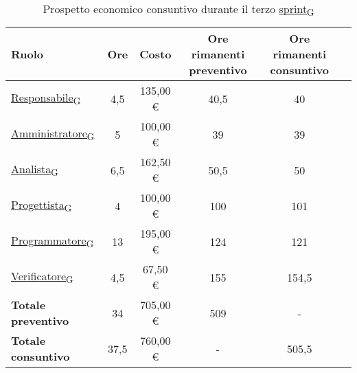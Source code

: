 \begin{table}[!h]
	\centering
	\begin{tabular}{ | l | c | c | c | c | c | }
		\hline
		\textbf{Ruolo}             & \textbf{Ore} & \textbf{Costo} & \textbf{Ore rimanenti preventivo} & \textbf{Ore rimanenti consuntivo} \\
		\hline
		\href{https://7last.github.io/docs/pb/documentazione-interna/glossario\#responsabile}{Responsabile\textsubscript{G}}               & 4,5          & 135,00 €       & 40,5                              & 40                                \\
		\href{https://7last.github.io/docs/pb/documentazione-interna/glossario\#amministratore}{Amministratore\textsubscript{G}}             & 5            & 100,00 €       & 39                                & 39                                \\
		\href{https://7last.github.io/docs/pb/documentazione-interna/glossario\#analista}{Analista\textsubscript{G}}                   & 6,5          & 162,50 €       & 50,5                              & 50                                \\
		\href{https://7last.github.io/docs/pb/documentazione-interna/glossario\#progettista}{Progettista\textsubscript{G}}                & 4            & 100,00 €       & 100                               & 101                               \\
		\href{https://7last.github.io/docs/pb/documentazione-interna/glossario\#programmatore}{Programmatore\textsubscript{G}}              & 13           & 195,00 €       & 124                               & 121                               \\
		\href{https://7last.github.io/docs/pb/documentazione-interna/glossario\#verificatore}{Verificatore\textsubscript{G}}               & 4,5          & 67,50 €        & 155                               & 154,5                             \\
		\hline
		\textbf{Totale preventivo} & 34           & 705,00 €       & 509                               & -                                 \\
		\hline
		\textbf{Totale consuntivo} & 37,5         & 760,00 €       & -                                 & 505,5                             \\
		\hline
	\end{tabular}
	\caption{Prospetto economico consuntivo durante il terzo \href{https://7last.github.io/docs/pb/documentazione-interna/glossario\#sprint}{sprint\textsubscript{G}}}
	
\end{table}

